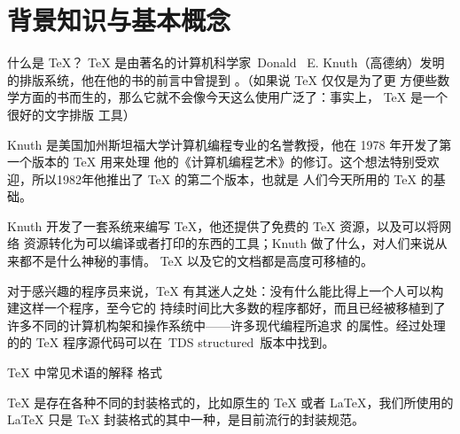 \section{背景知识与基本概念}

\begin{faq}{什么是 \TeX{}？}
  \TeX{} 是由著名的计算机科学家 Donald~ E. Knuth（高德纳）发明的排版系统，他在他的书的前言中曾提到%
  。（如果说 \TeX{} 仅仅是为了更
  方便些数学方面的书而生的，那么它就不会像今天这么使用广泛了：事实上， \TeX{} 是一个很好的文字排版
  工具）

  Knuth 是美国加州斯坦福大学计算机编程专业的名誉教授，他在 1978 年开发了第一个版本的 \TeX{} 用来处理
  他的《计算机编程艺术》的修订。这个想法特别受欢迎，所以1982年他推出了 \TeX{} 的第二个版本，也就是
  人们今天所用的 \TeX{} 的基础。

  Knuth 开发了一套系统来编写 \TeX{}，他还提供了免费的 \TeX{} 资源，以及可以将网络
  资源转化为可以编译或者打印的东西的工具；Knuth 做了什么，对人们来说从来都不是什么神秘的事情。
  \TeX{} 以及它的文档都是高度可移植的。

  对于感兴趣的程序员来说，\TeX{} 有其迷人之处：没有什么能比得上一个人可以构建这样一个程序，至今它的
  持续时间比大多数的程序都好，而且已经被移植到了许多不同的计算机构架和操作系统中——许多现代编程所追求
  的属性。经过处理的的 \TeX{} 程序源代码可以在 TDS structured 版本中找到。

\end{faq}

\begin{faq}{\TeX{} 中常见术语的解释}
  格式

  \TeX{} 是存在各种不同的封装格式的，比如原生的 \TeX{} 或者 \LaTeX{}，我们所使用的 \LaTeX{} 只是
  \TeX{} 封装格式的其中一种，是目前流行的封装规范。
\end{faq}
